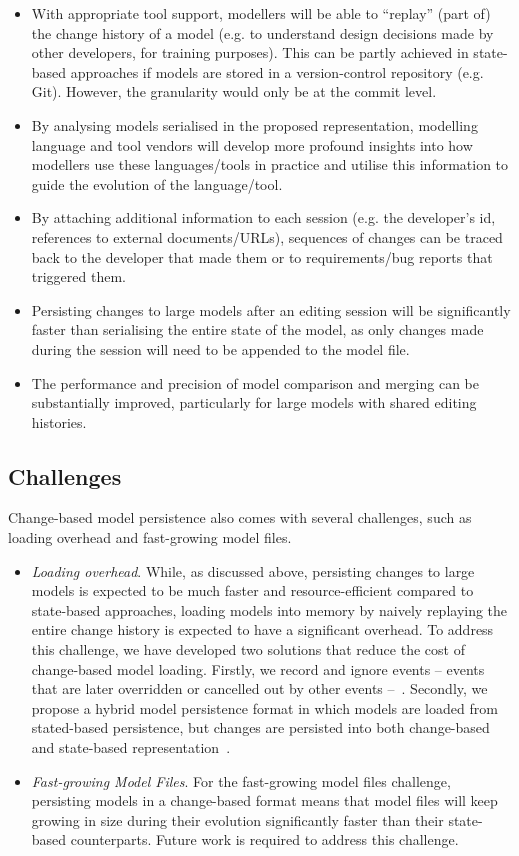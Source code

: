 \begin{itemize}
\item With appropriate tool support, modellers will be able to ``replay'' (part of) the change history of a model (e.g. to understand design decisions made by other developers, for training purposes). This can be partly achieved in state-based approaches if models are stored in a version-control repository (e.g. Git). However, the granularity would only be at the commit level.
\item By analysing models serialised in the proposed representation, modelling language and tool vendors will develop more profound insights into how modellers use these languages/tools in practice and utilise this information to guide the evolution of the language/tool.
\item By attaching additional information to each session (e.g. the developer's id, references to external documents/URLs), sequences of changes can be traced back to the developer that made them or to requirements/bug reports that triggered them.
\item Persisting changes to large models after an editing session will be significantly faster than serialising the entire state of the model, as only changes made during the session will need to be appended to the model file.
\item The performance and precision of model comparison and merging can be substantially improved, particularly for large models with shared editing histories.
\end{itemize}

\subsection{Challenges}
\label{sec:challenges}

Change-based model persistence also comes with several challenges, such as loading overhead and fast-growing model files. 
\begin{itemize}
\item \emph{Loading overhead}. While, as discussed above, persisting changes to large models is expected to be much faster and resource-efficient compared to state-based approaches, loading models into memory by naively replaying the entire change history is expected to have a significant overhead. To address this challenge, we have developed two solutions that reduce the cost of change-based model loading. Firstly, we record and ignore events -- events that are later overridden or cancelled out by other events --~\cite{yohannis2018towards}. Secondly, we propose a hybrid model persistence format in which models are loaded from stated-based persistence, but changes are persisted into both change-based and state-based representation~\cite{DBLP:conf/models/YohannisRPK18}. 
\item \emph{Fast-growing Model Files}. For the fast-growing model files challenge, persisting models in a change-based format means that model files will keep growing in size during their evolution significantly faster than their state-based counterparts. Future work is required to address this challenge.     
\end{itemize}



